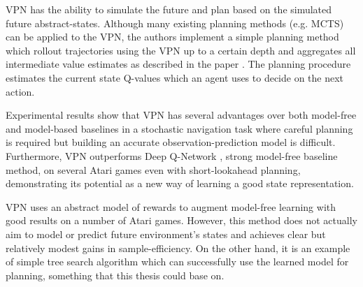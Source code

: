 VPN has the ability to simulate the future and plan based on the simulated future abstract-states. Although many existing planning methods (e.g. MCTS) can be applied to the VPN, the authors implement a simple planning method which rollout trajectories using the VPN up to a certain depth and aggregates all intermediate value estimates as described in the paper \cite{Algo.VPN}. The planning procedure estimates the current state Q-values which an agent uses to decide on the next action.

Experimental results show that VPN has several advantages over both model-free and model-based baselines in a stochastic navigation task where careful planning is required but building an accurate observation-prediction model is difficult. Furthermore, VPN outperforms Deep Q-Network \cite{Algo.DQN}, strong model-free baseline method, on several Atari games even with short-lookahead planning, demonstrating its potential as a new way of learning a good state representation.

VPN uses an abstract model of rewards to augment model-free learning with good results on a number of Atari games. However, this method does not actually aim to model or predict future environment's states and achieves clear but relatively modest gains in sample-efficiency. On the other hand, it is an example of simple tree search algorithm which can successfully use the learned model for planning, something that this thesis could base on.

